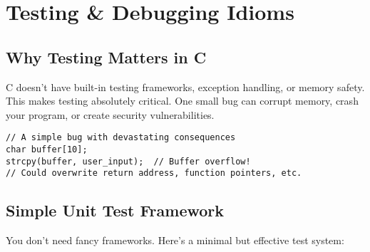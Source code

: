 \chapter{Testing \& Debugging Idioms}

\section{Why Testing Matters in C}

C doesn't have built-in testing frameworks, exception handling, or memory safety. This makes testing absolutely critical. One small bug can corrupt memory, crash your program, or create security vulnerabilities.

\begin{lstlisting}
// A simple bug with devastating consequences
char buffer[10];
strcpy(buffer, user_input);  // Buffer overflow!
// Could overwrite return address, function pointers, etc.
\end{lstlisting}

\section{Simple Unit Test Framework}

You don't need fancy frameworks. Here's a minimal but effective test system:

